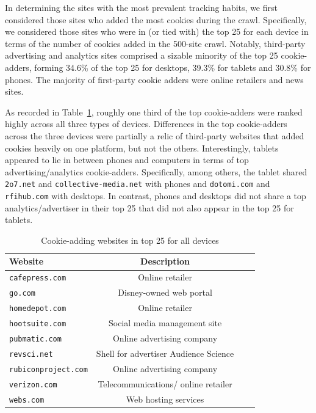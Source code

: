 \documentclass{acm_proc_article-sp}
\begin{document}
In determining the sites with the most prevalent tracking habits, we first considered those sites who added the most cookies during the crawl. Specifically, we considered those sites who were in (or tied with) the top 25 for each device in terms of the number of cookies added in the 500-site crawl. Notably, third-party advertising and analytics sites comprised a sizable minority of the top 25 cookie-adders, forming 34.6\% of the top 25 for desktops, 39.3\% for tablets and 30.8\% for phones. The majority of first-party cookie adders were online retailers and news sites.

As recorded in Table~\ref{tab:major_cookies}, roughly one third of the top cookie-adders were ranked highly across all three types of devices. Differences in the top cookie-adders across the three devices were partially a relic of third-party websites that added cookies heavily on one platform, but not the others. Interestingly, tablets appeared to lie in between phones and computers in terms of top advertising/analytics cookie-adders. Specifically, among others, the tablet shared \texttt{2o7.net} and \texttt{collective-media.net} with phones and \texttt{dotomi.com} and \texttt{rfihub.com} with desktops. In contrast, phones and desktops did not share a top analytics/advertiser in their top 25 that did not also appear in the top 25 for tablets.


\begin{table}[htbp]
  \centering
  \caption{Cookie-adding websites in top 25 for all devices}
    \begin{tabular}{|c|c|c|c|}
    \hline
     \multicolumn{1}{|l|}{\textbf{Website}} & \textbf{Description}    \\ \hline
    \multicolumn{1}{|l|}{\texttt{cafepress.com}} & Online retailer   \\
    \multicolumn{1}{|l|}{\texttt{go.com}} & Disney-owned web portal  \\
    \multicolumn{1}{|l|}{\texttt{homedepot.com}} & Online retailer    \\
    \multicolumn{1}{|l|}{\texttt{hootsuite.com}} & Social media management site   \\
    \multicolumn{1}{|l|}{\texttt{pubmatic.com}} & Online advertising company   \\
    \multicolumn{1}{|l|}{\texttt{revsci.net}} & Shell for advertiser Audience Science    \\
    \multicolumn{1}{|l|}{\texttt{rubiconproject.com}} & Online advertising company   \\
    \multicolumn{1}{|l|}{\texttt{verizon.com}} & Telecommunications/ online retailer   \\
    \multicolumn{1}{|l|}{\texttt{webs.com}} & Web hosting services  \\ \hline
    \end{tabular}%
  \label{tab:major_cookies}%
\end{table}%
\end{document}
